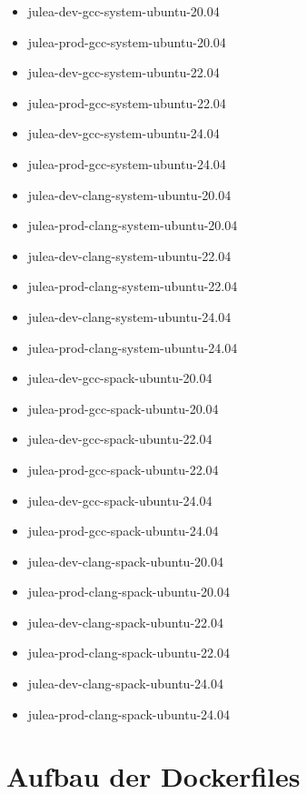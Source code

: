 \begin{multicols}{2}
    \begin{itemize}
        \item julea-dev-gcc-system-ubuntu-20.04  
        \item julea-prod-gcc-system-ubuntu-20.04  
        \item julea-dev-gcc-system-ubuntu-22.04  
        \item julea-prod-gcc-system-ubuntu-22.04  
        \item julea-dev-gcc-system-ubuntu-24.04  
        \item julea-prod-gcc-system-ubuntu-24.04  
        \item julea-dev-clang-system-ubuntu-20.04
        \item julea-prod-clang-system-ubuntu-20.04
        \item julea-dev-clang-system-ubuntu-22.04
        \item julea-prod-clang-system-ubuntu-22.04
        \item julea-dev-clang-system-ubuntu-24.04
        \item julea-prod-clang-system-ubuntu-24.04
        \item julea-dev-gcc-spack-ubuntu-20.04   
        \item julea-prod-gcc-spack-ubuntu-20.04   
        \item julea-dev-gcc-spack-ubuntu-22.04   
        \item julea-prod-gcc-spack-ubuntu-22.04   
        \item julea-dev-gcc-spack-ubuntu-24.04   
        \item julea-prod-gcc-spack-ubuntu-24.04   
        \item julea-dev-clang-spack-ubuntu-20.04 
        \item julea-prod-clang-spack-ubuntu-20.04 
        \item julea-dev-clang-spack-ubuntu-22.04 
        \item julea-prod-clang-spack-ubuntu-22.04 
        \item julea-dev-clang-spack-ubuntu-24.04 
        \item julea-prod-clang-spack-ubuntu-24.04 
    \end{itemize} 
\end{multicols}

\section{Aufbau der Dockerfiles}

